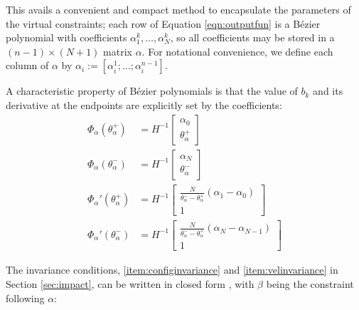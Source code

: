 This avails a convenient and compact method to encapsulate the parameters of the virtual constraints; each row of Equation \ref{eqn:outputfun} is a Bézier polynomial with coefficients $\alpha_1^k, \ldots, \alpha_N^k$, so all coefficients may be stored in a $(n-1)\times(N+1)$ matrix $\alpha$. For notational convenience, we define each column of $\alpha$ by $\alpha_i := [\alpha_i^1; \ldots; \alpha_i^{n-1}]$. %

A characteristic property of Bézier polynomials is that the value of $b_k$ and its derivative at the endpoints are explicitly set by the coefficients:
\begin{subequations}
\begin{align}
	\Phi_\alpha\left(\theta_\alpha^+\right) &= H^{-1}\begin{bmatrix}
		\alpha_0 \\ \theta_\alpha^+
	\end{bmatrix} \\
	\Phi_\alpha\left(\theta_\alpha^-\right) &= H^{-1}\begin{bmatrix}
		\alpha_N \\ \theta_\alpha^-
	\end{bmatrix} \\
	\Phi_\alpha'\left(\theta_\alpha^+\right) &= H^{-1}\begin{bmatrix}
		\frac{N}{\theta_\alpha^- - \theta_\alpha^+}(\alpha_1 - \alpha_0) \\
		1
	\end{bmatrix} \\
	\Phi_\alpha'\left(\theta_\alpha^-\right) &= H^{-1}\begin{bmatrix}
		\frac{N}{\theta_\alpha^- - \theta_\alpha^+}(\alpha_N - \alpha_{N-1}) \\
		1
	\end{bmatrix}
\end{align}
\end{subequations}

The invariance conditions, \ref{item:configinvariance} and \ref{item:velinvariance} in Section \ref{sec:impact}, can be written in closed form \cite{westervelt2007feedback}, with $\beta$ being the constraint following $\alpha$:

